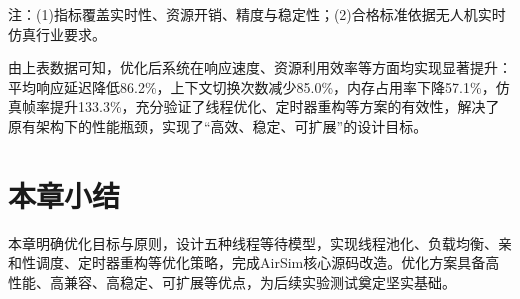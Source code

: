 注：(1)指标覆盖实时性、资源开销、精度与稳定性；(2)合格标准依据无人机实时仿真行业要求。

由上表数据可知，优化后系统在响应速度、资源利用效率等方面均实现显著提升：平均响应延迟降低86.2\%，上下文切换次数减少85.0\%，内存占用率下降57.1\%，仿真帧率提升133.3\%，充分验证了线程优化、定时器重构等方案的有效性，解决了原有架构下的性能瓶颈，实现了``高效、稳定、可扩展''的设计目标。

\section{本章小结}

本章明确优化目标与原则，设计五种线程等待模型，实现线程池化、负载均衡、亲和性调度、定时器重构等优化策略，完成AirSim核心源码改造。优化方案具备高性能、高兼容、高稳定、可扩展等优点，为后续实验测试奠定坚实基础。
